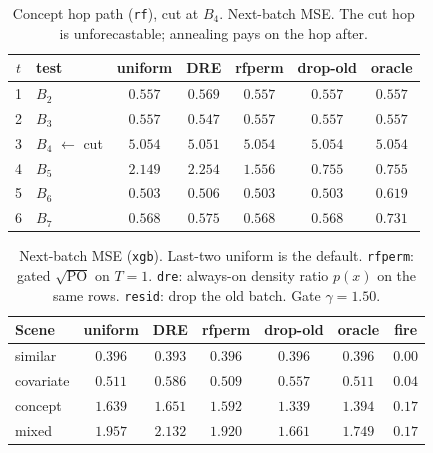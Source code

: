 \begin{table}[ht]\centering
\caption{Concept hop path (\texttt{rf}), cut at $B_4$.
Next-batch MSE. The cut hop is unforecastable; annealing pays on the hop after.}
\label{tab:po-refit-concept-rf}
\small
\setlength{\tabcolsep}{3.5pt}
\begin{tabular}{@{}clccccc@{}}\toprule
$t$ & test & uniform & DRE & rfperm & drop-old & oracle \\
\midrule
1 & $B_{2}$ & $\mathbf{0.557}$ & $0.569$ & $\mathbf{0.557}$ & $\mathbf{0.557}$ & $0.557$ \\
2 & $B_{3}$ & $0.557$ & $\mathbf{0.547}$ & $0.557$ & $0.557$ & $0.557$ \\
3 & $B_{4}$ $\leftarrow$ cut & $5.054$ & $\mathbf{5.051}$ & $5.054$ & $5.054$ & $5.054$ \\
4 & $B_{5}$ & $2.149$ & $2.254$ & $1.556$ & $\mathbf{0.755}$ & $0.755$ \\
5 & $B_{6}$ & $\mathbf{0.503}$ & $0.506$ & $\mathbf{0.503}$ & $\mathbf{0.503}$ & $0.619$ \\
6 & $B_{7}$ & $\mathbf{0.568}$ & $0.575$ & $\mathbf{0.568}$ & $\mathbf{0.568}$ & $0.731$ \\
\bottomrule
\end{tabular}
\end{table}

\begin{table}[ht]\centering
\caption{Next-batch MSE (\texttt{xgb}). Last-two uniform is the
default. \texttt{rfperm}: gated $\sqrt{\mathrm{PO}}$ on $T=1$.
\texttt{dre}: always-on density ratio $p(x)$ on the same rows.
\texttt{resid}: drop the old batch. Gate $\gamma=1.50$.}
\label{tab:po-refit-mse-xgb}
\small
\setlength{\tabcolsep}{3.5pt}
\begin{tabular}{@{}lcccccc@{}}\toprule
Scene & uniform & DRE & rfperm & drop-old & oracle & fire \\
\midrule
similar & $0.396$ & $\mathbf{0.393}$ & $0.396$ & $0.396$ & $0.396$ & $0.00$ \\
covariate & $0.511$ & $0.586$ & $\mathbf{0.509}$ & $0.557$ & $0.511$ & $0.04$ \\
concept & $1.639$ & $1.651$ & $1.592$ & $\mathbf{1.339}$ & $1.394$ & $0.17$ \\
mixed & $1.957$ & $2.132$ & $1.920$ & $\mathbf{1.661}$ & $1.749$ & $0.17$ \\
\bottomrule
\end{tabular}
\end{table}

